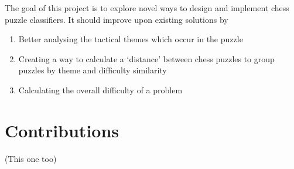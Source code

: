 The goal of this project is to explore novel ways to design and implement chess
puzzle classifiers. It should improve upon existing solutions by

\begin{enumerate}
    \item Better analysing the tactical themes which occur in the puzzle
    \item Creating a way to calculate a `distance' between chess puzzles to 
    group puzzles by theme and difficulty similarity
    \item Calculating the overall difficulty of a problem
\end{enumerate}

\section{Contributions}

(This one too)

